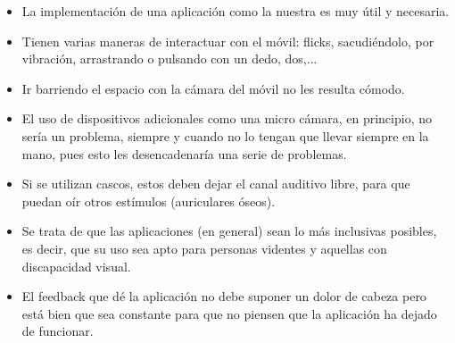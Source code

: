 \documentclass{article}
\begin{document}
\begin{itemize}
	\item La implementación de una aplicación como la nuestra es muy útil y necesaria.
	\item Tienen varias maneras de interactuar con el móvil: flicks, sacudiéndolo, por vibración, arrastrando o pulsando con un dedo, dos,...
	\item Ir barriendo el espacio con la cámara del móvil no les resulta cómodo.
	\item El uso de dispositivos adicionales como una micro cámara, en principio, no sería un problema, siempre y cuando no lo tengan que llevar siempre en la mano, pues esto les desencadenaría una serie de problemas.
	\item Si se utilizan cascos, estos deben dejar el canal auditivo libre, para que puedan oír otros estímulos (auriculares óseos).
	\item Se trata de que las aplicaciones (en general) sean lo más inclusivas posibles, es decir, que su uso sea apto para personas videntes y aquellas con discapacidad visual.
	\item El feedback que dé la aplicación no debe suponer un dolor de cabeza pero está bien que sea constante para que no piensen que la aplicación ha dejado de funcionar.
\end{itemize}
	
	
\end{document}
